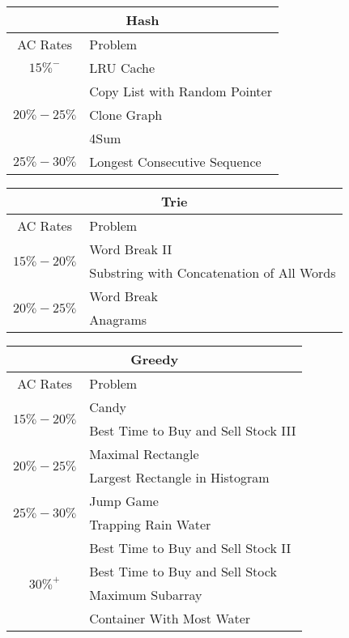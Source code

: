 \documentclass[paper=a4, fontsize=11pt]{scrartcl} %
\begin{document}
\begin{center}
  \begin{tabular}{|c|l|}
      \hline
      \multicolumn{2}{|c|}{Hash} \\
      \hline
      AC Rates      &   Problem     \\
      \hline
      \multirow{1}{*}{$15\%^-$}  &    LRU Cache    \\
      \hline
      \multirow{3}{*}{$20\%-25\%$}  &    Copy List with Random Pointer    \\
          & Clone Graph  \\
          & 4Sum \\
      \hline
      \multirow{1}{*}{$25\%-30\%$}  &    Longest Consecutive Sequence    \\
      \hline
  \end{tabular}

  \vspace{10mm}

  \begin{tabular}{|c|l|}
      \hline
      \multicolumn{2}{|c|}{Trie} \\
      \hline
      AC Rates      &   Problem     \\
      \hline
      \multirow{2}{*}{$15\%-20\%$}  &    Word Break II \\
          & Substring with Concatenation of All Words \\
      \hline
      \multirow{2}{*}{$20\%-25\%$}  &    Word Break \\
          & Anagrams  \\
      \hline
  \end{tabular}

  \vspace{10mm}

  \begin{tabular}{|c|l|}
      \hline
      \multicolumn{2}{|c|}{Greedy} \\
      \hline
      AC Rates      &   Problem     \\
      \hline
      \multirow{2}{*}{$15\%-20\%$}  &    Candy  \\
          & Best Time to Buy and Sell Stock III \\
      \hline
      \multirow{2}{*}{$20\%-25\%$}  &    Maximal Rectangle  \\
          & Largest Rectangle in Histogram  \\
      \hline
      \multirow{2}{*}{$25\%-30\%$}  &    Jump Game  \\
          & Trapping Rain Water \\
      \hline
      \multirow{4}{*}{$30\%^+$}  &  Best Time to Buy and Sell Stock II \\
          & Best Time to Buy and Sell Stock \\
          & Maximum Subarray  \\
          & Container With Most Water \\
      \hline
  \end{tabular}


\end{center}
\end{document}
